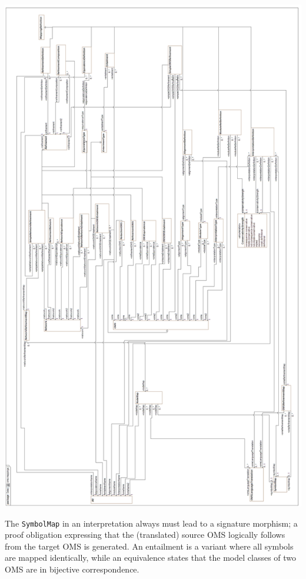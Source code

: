 \documentclass[10pt,fleqn,final]{scrreprt}
\newcommand*{\syntax}[1]{\texttt{#1}}
\newenvironment{definitions}[0]{\medskip }{}
\begin{document}
\begin{definitions}
\begin{center}
\includegraphics[height=\textheight]{mof/Class_Diagram__oms-mappings.png}
\end{center}

The \syntax{SymbolMap} in an interpretation always must lead to a signature morphism; a proof 
obligation expressing that the (translated) source OMS logically follows from the target OMS is 
generated.  An entailment is a variant where all symbols are mapped identically, while an 
equivalence states that the model classes of two OMS are in bijective correspondence.


\end{definitions}
\end{document}
